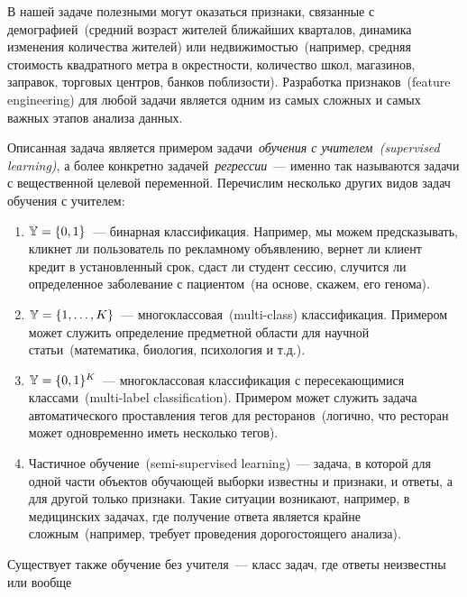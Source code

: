 \documentclass[12pt,fleqn]{article}
\begin{document}
В нашей задаче полезными могут оказаться признаки, связанные с демографией~(средний возраст
жителей ближайших кварталов, динамика изменения количества жителей) или
недвижимостью~(например, средняя стоимость квадратного метра в окрестности,
количество школ, магазинов, заправок, торговых центров, банков поблизости).
Разработка признаков~(feature engineering) для любой задачи
является одним из самых сложных и самых важных этапов анализа данных.

Описанная задача является примером задачи~\emph{обучения с учителем~(supervised learning)},
а более конкретно задачей~\emph{регрессии}~--- именно так называются задачи
с вещественной целевой переменной.
Перечислим несколько других видов задач обучения с учителем:
\begin{enumerate}
    \item $\mathbb{Y} = \{0, 1\}$~--- бинарная классификация. Например, мы можем предсказывать,
        кликнет ли пользователь по рекламному объявлению,
        вернет ли клиент кредит в установленный срок,
        сдаст ли студент сессию,
        случится ли определенное заболевание с пациентом~(на основе, скажем, его генома).
    \item $\mathbb{Y} = \{1, \dots, K\}$~--- многоклассовая~(multi-class) классификация.
        Примером может служить определение предметной области для научной статьи~(математика, биология,
        психология и т.д.).
    \item $\mathbb{Y} = \{0, 1\}^K$~--- многоклассовая классификация с пересекающимися классами~(multi-label classification).
        Примером может служить задача автоматического проставления тегов для ресторанов~(логично, что ресторан может
        одновременно иметь несколько тегов).
    \item Частичное обучение~(semi-supervised learning)~--- задача, в которой для одной части объектов обучающей
        выборки известны и признаки, и ответы, а для другой только признаки.
        Такие ситуации возникают, например, в медицинских задачах,
        где получение ответа является крайне сложным~(например, требует проведения
        дорогостоящего анализа).
\end{enumerate}
Существует также обучение без учителя~--- класс задач, где ответы неизвестны или вообще
\end{document}
